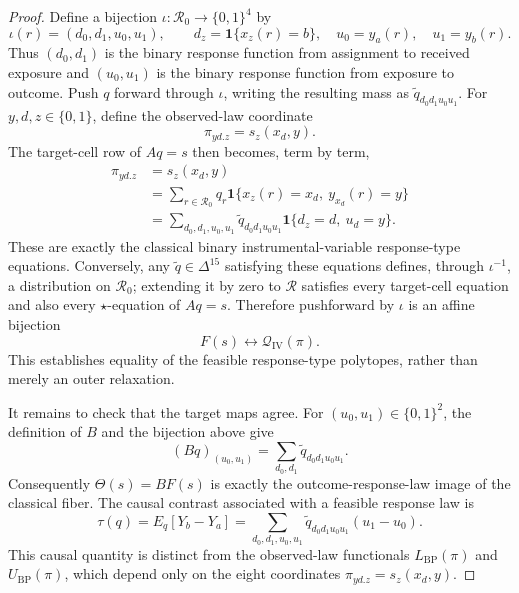 \documentclass{article}
\begin{document}
\begin{proof}
Define a bijection \(\iota:\mathcal R_0\to\{0,1\}^4\) by
\[
\iota(r)=(d_0,d_1,u_0,u_1),\qquad
d_z=\mathbf 1\{x_z(r)=b\},\quad u_0=y_a(r),\quad u_1=y_b(r).
\]
Thus \((d_0,d_1)\) is the binary response function from assignment to received exposure and \((u_0,u_1)\) is the binary response function from exposure to outcome. Push \(q\) forward through \(\iota\), writing the resulting mass as \(\widetilde q_{d_0d_1u_0u_1}\). For \(y,d,z\in\{0,1\}\), define the observed-law coordinate
\[
\pi_{yd.z}=s_z(x_d,y).
\]
The target-cell row of \(Aq=s\) then becomes, term by term,
\[
\begin{aligned}
\pi_{yd.z}
&=s_z(x_d,y)\\
&=\sum_{r\in\mathcal R_0}q_r
  \mathbf 1\{x_z(r)=x_d,\ y_{x_d}(r)=y\}\\
&=\sum_{d_0,d_1,u_0,u_1}
  \widetilde q_{d_0d_1u_0u_1}
  \mathbf 1\{d_z=d,\ u_d=y\}.
\end{aligned}
\]
These are exactly the classical binary instrumental-variable response-type equations. Conversely, any \(\widetilde q\in\Delta^{15}\) satisfying these equations defines, through \(\iota^{-1}\), a distribution on \(\mathcal R_0\); extending it by zero to \(\mathcal R\) satisfies every target-cell equation and also every \(\star\)-equation of \(Aq=s\). Therefore pushforward by \(\iota\) is an affine bijection
\[
F(s)\longleftrightarrow\mathcal Q_{\mathrm{IV}}(\pi).
\]
This establishes equality of the feasible response-type polytopes, rather than merely an outer relaxation.

It remains to check that the target maps agree. For \((u_0,u_1)\in\{0,1\}^2\), the definition of \(B\) and the bijection above give
\[
(Bq)_{(u_0,u_1)}
=\sum_{d_0,d_1}\widetilde q_{d_0d_1u_0u_1}.
\]
Consequently \(\Theta(s)=BF(s)\) is exactly the outcome-response-law image of the classical fiber. The causal contrast associated with a feasible response law is
\[
\tau(q)=E_q[Y_b-Y_a]
=\sum_{d_0,d_1,u_0,u_1}
 \widetilde q_{d_0d_1u_0u_1}(u_1-u_0).
\]
This causal quantity is distinct from the observed-law functionals \(L_{\mathrm{BP}}(\pi)\) and \(U_{\mathrm{BP}}(\pi)\), which depend only on the eight coordinates \(\pi_{yd.z}=s_z(x_d,y)\).


\end{proof}
\end{document}
